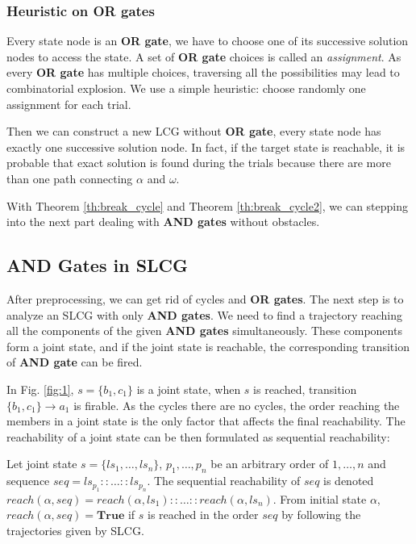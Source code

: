 \documentclass[runningheads]{llncs}
\newcommand{\ac}[3]{$\{#1\}\rightarrow#3$}
\begin{document}
\subsubsection{Heuristic on OR gates}\label{sec:OR}
Every state node is an \textbf{OR gate}, we have to choose one of its successive solution nodes to access the state. 
A set of \textbf{OR gate} choices is called an \textit{assignment}.
As every \textbf{OR gate} has multiple choices, traversing all the possibilities may lead to combinatorial explosion.
We use a simple heuristic: 
choose randomly one assignment for each trial.

Then we can construct a new LCG without \textbf{OR gate}, every state node has exactly one successive solution node.
In fact, if the target state is reachable, it is probable that exact solution is found during the trials because there are more than one path connecting $\alpha$ and $\omega$.

With Theorem \ref{th:break_cycle} and Theorem \ref{th:break_cycle2}, we can stepping into the next part dealing with \textbf{AND gates} without obstacles.

\subsection{AND Gates in SLCG}\label{sectAndGates}
After preprocessing, we can get rid of cycles and \textbf{OR gates}.
The next step is to analyze an SLCG with only \textbf{AND gates}.
We need to find a trajectory reaching all the components of the given \textbf{AND gates} simultaneously.
These components form a joint state, and if the joint state is reachable, the corresponding transition of \textbf{AND gate} can be fired. 

In Fig. \ref{fig:1}, $s=\{ b_1,c_1\}$ is a joint state, when $s$ is reached, transition \ac{b_1,c_1}{a_0}{a_1} is firable.
As the cycles there are no cycles, the order reaching the members in a joint state is the only factor that affects the final reachability. 
The reachability of a joint state can be then formulated as sequential reachability:
\begin{definition}
Let joint state $s=\{ls_1,\ldots,ls_n\}$, $p_1,\ldots ,p_n$ be an arbitrary order of $1,\ldots ,n$ and sequence $seq=ls_{p_1}::\ldots::ls_{p_n}$.
The sequential reachability of $seq$ is denoted $reach(\alpha,seq)=reach(\alpha,ls_1)::\ldots::reach(\alpha,ls_n)$.
From initial state $\alpha$, $reach(\alpha,seq)=\mathbf{True}$ if $s$ is reached in the order $seq$ by following the trajectories given by SLCG.
\end{definition}
\end{document}
